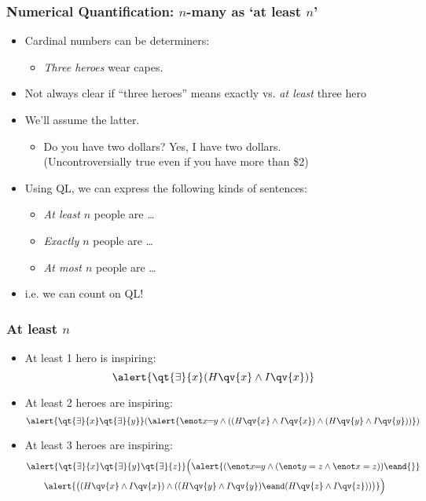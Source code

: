 \begin{frame}
    \frametitle{Numerical Quantification: $n$-many as `at least $n$'}

\begin{itemize}[<+->]
\item Cardinal numbers can be determiners:
\begin{itemize}
\item \emph{Three heroes} wear capes.
\end{itemize}
\item Not always clear if ``three heroes'' means \textcolor{highlightB}{exactly} vs. \emph{at least} three hero
\item We'll assume the \textcolor{highlightA}{latter}.%
\begin{itemize}[<+->]
\item Do you have two dollars? Yes, I have two dollars. \\ (Uncontroversially true even if you have more than \$2)
\end{itemize}
\item Using QL, we can express the following kinds of sentences:
\begin{itemize}[<+->]
\item \emph{At least $n$} people are \dots
\item \emph{Exactly $n$} people are \dots
\item \emph{At most $n$} people are \dots
\end{itemize}
\item i.e. we can count on QL! 
\end{itemize}
\end{frame}

\begin{frame}
    \frametitle{At least $n$}

\begin{itemize}[<+->]
\item At least 1 hero is inspiring:
\[
\alert{\qt{\exists}{x}(H\qv{x} \land I\qv{x})}
\]
\item At least 2 heroes are inspiring:
\[
\alert{\qt{\exists}{x}\qt{\exists}{y}}(\alert{\enot x\!\!=\!\!y \land ((H\qv{x} \land I\qv{x}) \land (H\qv{y} \land I\qv{y}))})
\]
\item At least 3 heroes are inspiring:
\begin{align*}
& \alert{\qt{\exists}{x}\qt{\exists}{y}\qt{\exists}{z}}\Big(\alert{(\enot x\!\!=\!\!y \land (\enot y = z \land \enot x = z)) \eand {}} \\
& \qquad \alert{\big((H\qv{x} \land I\qv{x}) \land ((H\qv{y} \land I\qv{y}) \eand (H\qv{z} \land I\qv{z}))\big)}\Big)
\end{align*}
\end{itemize}
\end{frame}


